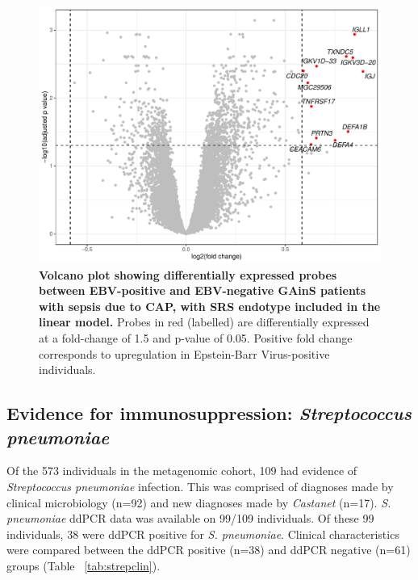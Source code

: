 \begin{figure}[htbp]
\centering
\includegraphics[width=\textwidth]{./Results3/Images/ebvsig2.pdf}
\caption[EBV signature with SRS as covariate]{\textbf{Volcano plot showing differentially expressed probes between EBV-positive and EBV-negative GAinS patients with sepsis due to CAP, with SRS endotype included in the linear model.} Probes in red (labelled) are differentially expressed at a fold-change of 1.5 and p-value of 0.05. Positive fold change corresponds to upregulation in Epstein-Barr Virus-positive individuals.}
\label{fig:ebvsig2}


\end{figure}
\FloatBarrier

\subsection{Evidence for immunosuppression: \textit{Streptococcus pneumoniae}}

Of the 573 individuals in the metagenomic cohort, 109 had evidence of \textit{Streptococcus pneumoniae} infection. This was comprised of diagnoses made by clinical microbiology (n=92) and new diagnoses made by \textit{Castanet} (n=17). \textit{S. pneumoniae} ddPCR data was available on 99/109 individuals. Of these 99 individuals, 38 were ddPCR positive for \textit{S. pneumoniae}. Clinical characteristics were compared between the ddPCR positive (n=38) and ddPCR negative (n=61) groups (Table ~\ref{tab:strepclin}). 

